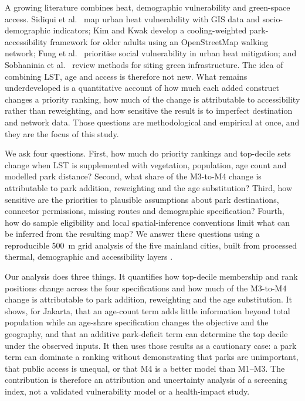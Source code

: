 \documentclass[times,twoside]{_Templates/MultiTargetManuscript}
\begin{document}
A growing literature combines heat, demographic vulnerability and green-space
access. Sidiqui et al.\ \citep{sidiqui2022} map urban heat vulnerability with
GIS data and socio-demographic indicators; Kim and Kwak \citep{kim2026} develop a
cooling-weighted park-accessibility framework for older adults using an
OpenStreetMap walking network; Fung et al.\ \citep{fung2024} prioritise social
vulnerability in urban heat mitigation; and Sobhaninia et al.\
\citep{sobhaninia2025} review methods for siting green infrastructure. The idea
of combining LST, age and access is therefore not new. What remains
underdeveloped is a quantitative account of how much each added construct
changes a priority ranking, how much of the change is attributable to
accessibility rather than reweighting, and how sensitive the result is to
imperfect destination and network data. Those questions are methodological and
empirical at once, and they are the focus of this study.

We ask four questions. First, how much do priority rankings and top-decile sets
change when LST is supplemented with vegetation, population, age count and
modelled park distance? Second, what share of the M3-to-M4 change is attributable
to park addition, reweighting and the age substitution? Third, how sensitive are
the priorities to plausible assumptions about park destinations, connector
permissions, missing routes and demographic specification? Fourth, how do sample
eligibility and local spatial-inference conventions limit what can be inferred
from the resulting map? We answer these questions using a reproducible 500~m
grid analysis of the five mainland cities, built from processed thermal,
demographic and accessibility layers \citep{jhim2026}.

Our analysis does three things. It quantifies how top-decile membership and
rank positions change across the four specifications and how much of the
M3-to-M4 change is attributable to park addition, reweighting and the age
substitution. It shows, for Jakarta, that an age-count term adds little
information beyond total population while an age-share specification changes
the objective and the geography, and that an additive park-deficit term can
determine the top decile under the observed inputs. It then uses those results
as a cautionary case: a park term can dominate a ranking without demonstrating
that parks are unimportant, that public access is unequal, or that M4 is a
better model than M1--M3. The contribution is therefore an attribution and
uncertainty analysis of a screening index, not a validated vulnerability model
or a health-impact study.
\end{document}
